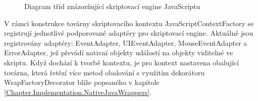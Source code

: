 \begin{figure}[H]
  \begin{center}
    \caption{Diagram tříd znázorňující skriptovací engine JavaScriptu}
    \label{Figure.WindowJavaScriptEngine}
  \end{center}
\end{figure}

V rámci konstrukce továrny skriptovacího kontextu JavaScriptContextFactory se registrují jednotlivé podporované adaptéry pro skriptovací engine. Aktuálně jsou registrovány adaptéry: EventAdapter, UIEventAdapter, MouseEventAdapter a ErrorAdapter, jež převádí nativní objekty událostí na objekty viditelné ve skriptu. Když dochází k tvorbě kontextu, je pro kontext nastavena obalující továrna, která řetězí více metod obalování s využitím dekorátoru WrapFactoryDecorator blíže popsaného v kapitole \ref{Chapter.Implementation.NativeJavaWrappers}.

